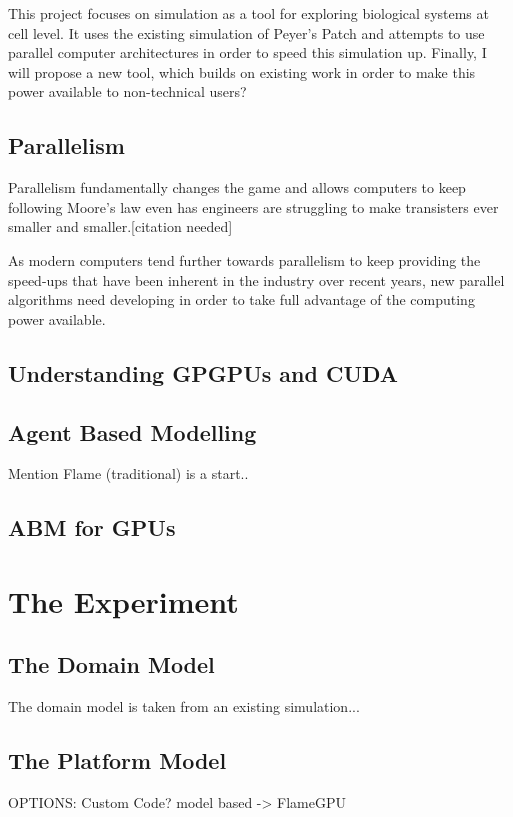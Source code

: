 \documentclass{UoYCSproject}
\begin{document}
This project focuses on simulation as a tool for exploring biological systems at cell level. It uses the existing simulation of Peyer's Patch\cite{kieran_thesis} and attempts to use parallel computer architectures in order to speed this simulation up. Finally, I will propose a new tool, which builds on existing work in order to make this power available to non-technical users?

\section{Parallelism}
Parallelism fundamentally changes the game and allows computers to keep following Moore's law even has engineers are struggling to make transisters ever smaller and smaller.[citation needed]

As modern computers tend further towards parallelism to keep providing the speed-ups that have been inherent in the industry over recent years, new parallel algorithms need developing in order to take full advantage of the computing power available. 



\section{Understanding GPGPUs and CUDA}

\section{Agent Based Modelling}
Mention Flame (traditional) is a start..

\section{ABM for GPUs}


\chapter{The Experiment}
\section{The Domain Model}
The domain model is taken from an existing simulation...

\section{The Platform Model}
OPTIONS:
Custom Code?\cite{phil_diss}
model based -> FlameGPU\cite{flame_keratinocyte}
\end{document}
